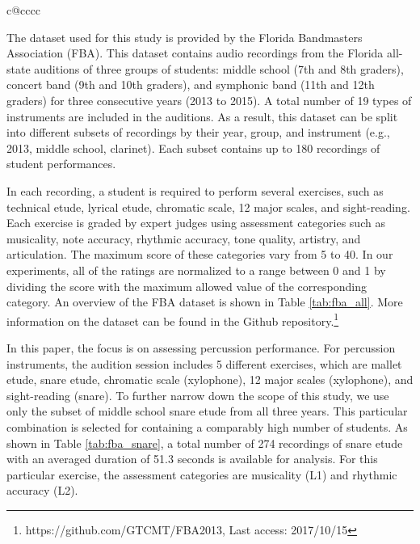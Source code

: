\documentclass[conference]{IEEEtran}
\begin{document}
\begin{table}
\begin{tabularx}{\columnwidth}{c@{\extracolsep{\fill}}cccc}
 \\ \hline
\end{tabularx}
\label{tab:fba_all}
\end{table}


The dataset used for this study is provided by the Florida Bandmasters Association (FBA). This dataset contains audio recordings from the Florida all-state auditions of three groups of students: middle school (7th and 8th graders), concert band (9th and 10th graders), and symphonic band (11th and 12th graders) for three consecutive years (2013 to 2015). A total number of 19 types of instruments are included in the auditions. As a result, this dataset can be split into different subsets of recordings by their year, group, and instrument (e.g., 2013, middle school, clarinet). Each subset contains up to 180 recordings of student performances.  

In each recording, a student is required to perform several exercises, such as technical etude, lyrical etude, chromatic scale, 12 major scales, and sight-reading. Each exercise is graded by expert judges using assessment categories such as musicality, note accuracy, rhythmic accuracy, tone quality, artistry, and articulation. The maximum score of these categories vary from 5 to 40. In our experiments, all of the ratings are normalized to a range between 0 and 1 by dividing the score with the maximum allowed value of the corresponding category. An overview of the FBA dataset is shown in Table \ref{tab:fba_all}. More information on the dataset can be found in the Github repository.\footnote{https://github.com/GTCMT/FBA2013, Last access: 2017/10/15}%

In this paper, the focus is on assessing percussion performance. For percussion instruments, the audition session includes 5 different exercises, which are mallet etude, snare etude, chromatic scale (xylophone), 12 major scales (xylophone), and sight-reading (snare). To further narrow down the scope of this study, we use only the subset of middle school snare etude from all three years. This particular combination is selected for containing a comparably high number of students. As shown in Table \ref{tab:fba_snare}, a total number of 274 recordings of snare etude with an averaged duration of 51.3 seconds is available for analysis. For this particular exercise, the assessment categories are musicality (L1) and rhythmic accuracy (L2).
\end{document}
